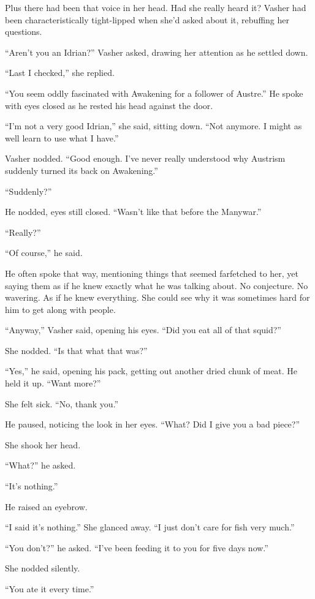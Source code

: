 Plus there had been that voice in her head. Had she really heard it? Vasher had been characteristically tight-lipped when she’d asked about it, rebuffing her questions.

“Aren’t you an Idrian?” Vasher asked, drawing her attention as he settled down.

“Last I checked,” she replied.

“You seem oddly fascinated with Awakening for a follower of Austre.” He spoke with eyes closed as he rested his head against the door.

“I’m not a very good Idrian,” she said, sitting down. “Not anymore. I might as well learn to use what I have.”

Vasher nodded. “Good enough. I’ve never really understood why Austrism suddenly turned its back on Awakening.”

“Suddenly?”

He nodded, eyes still closed. “Wasn’t like that before the Manywar.”

“Really?”

“Of course,” he said.

He often spoke that way, mentioning things that seemed farfetched to her, yet saying them as if he knew exactly what he was talking about. No conjecture. No wavering. As if he knew everything. She could see why it was sometimes hard for him to get along with people.

“Anyway,” Vasher said, opening his eyes. “Did you eat all of that squid?”

She nodded. “Is that what that was?”

“Yes,” he said, opening his pack, getting out another dried chunk of meat. He held it up. “Want more?”

She felt sick. “No, thank you.”

He paused, noticing the look in her eyes. “What? Did I give you a bad piece?”

She shook her head.

“What?” he asked.

“It’s nothing.”

He raised an eyebrow.

“I said it’s nothing.” She glanced away. “I just don’t care for fish very much.”

“You don’t?” he asked. “I’ve been feeding it to you for five days now.”

She nodded silently.

“You ate it every time.”

